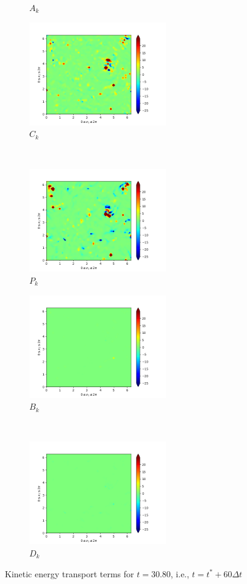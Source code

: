 \begin{figure}[H]
\begin{subfigure}{0.45\textwidth}
        \caption{$A_{k}$}
    \end{subfigure}
    \newline
    \begin{subfigure}{0.45\textwidth}
        \includegraphics[height=1.75in]{media/run-cds-65/C-ke-1400.png}
        \caption{$C_{k}$}
    \end{subfigure}
    ~
    \begin{subfigure}{0.45\textwidth}
        \includegraphics[height=1.75in]{media/run-cds-65/P-ke-1400.png}
        \caption{$P_{k}$}
    \end{subfigure}
    \newline
    \begin{subfigure}{0.45\textwidth}
        \includegraphics[height=1.75in]{media/run-cds-65/B-ke-1400.png}
        \caption{$B_{k}$}
    \end{subfigure}
    ~
    \begin{subfigure}{0.45\textwidth}
        \includegraphics[height=1.75in]{media/run-cds-65/D-ke-1400.png}
        \caption{$D_{k}$}
    \end{subfigure}
    \caption{Kinetic energy transport terms for $t=30.80$, i.e., $t=t^{\ast} + 60 \Delta t$}
\end{figure}
